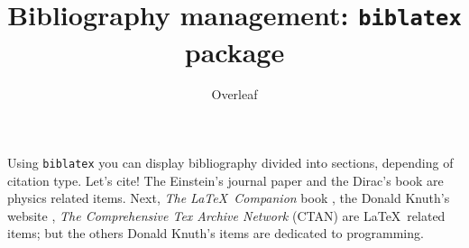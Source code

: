 \documentclass{article}
\title{Bibliography management: \texttt{biblatex} package}
\author{Overleaf}
\date{ }
\begin{document}
	
	\maketitle
	
	Using \texttt{biblatex} you can display bibliography divided into sections, 
	depending of citation type. 
	Let's cite! The Einstein's journal paper \cite{einstein} and the Dirac's 
	book \cite{dirac} are physics related items. 
	Next, \textit{The \LaTeX\ Companion} book \cite{latexcompanion}, the Donald 
	Knuth's website \cite{knuthwebsite}, \textit{The Comprehensive Tex Archive 
		Network} (CTAN) \cite{ctan} are \LaTeX\ related items; but the others Donald 
	Knuth's items \cite{knuth-fa,knuth-acp} are dedicated to programming. 
	
	\medskip
	
	\printbibliography
	
\end{document}
